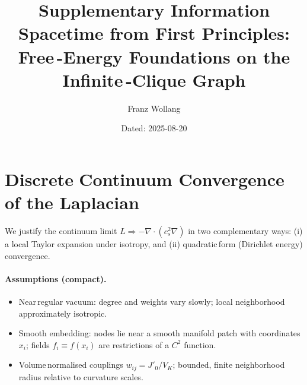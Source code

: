 \documentclass[11pt]{article}
\title{Supplementary Information\\Spacetime from First Principles: Free\mbox{\,-}Energy Foundations on the Infinite\mbox{\,-}Clique Graph}
\author[ ]{Franz Wollang}
\affil[ ]{\small Independent Researcher}
\date{\small Dated: 2025-08-20}
\begin{document}
\maketitle

\pagestyle{fancy}
\fancyhf{}
\renewcommand{\headrulewidth}{0pt}
\renewcommand{\footrulewidth}{0pt}

\begin{center}
\setlength{\fboxsep}{8pt}%
\end{center}
\vspace{1em}

\tableofcontents
\vspace{1em}
\vspace{1em}


\section{Discrete\,\textrightarrow\,Continuum Convergence of the Laplacian}\label{si:disc-cont-conv}
We justify the continuum limit $L \Rightarrow -\nabla\!\cdot(c_s^2\nabla)$ in two complementary ways: (i) a local Taylor expansion under isotropy, and (ii) quadratic\,form (Dirichlet energy) convergence.

\paragraph{Assumptions (compact).}
\begin{itemize}[leftmargin=*]
  \item Near\,regular vacuum: degree and weights vary slowly; local neighborhood approximately isotropic.
  \item Smooth embedding: nodes lie near a smooth manifold patch with coordinates $x_i$; fields $f_i\equiv f(x_i)$ are restrictions of a $C^2$ function.
  \item Volume\,normalised couplings $w_{ij}=J'_0/V_K$; bounded, finite neighborhood radius relative to curvature scales.
\end{itemize}
\end{document}
